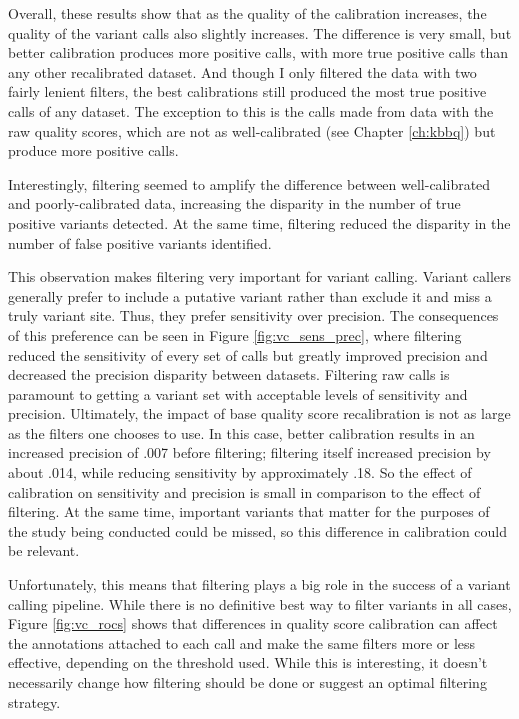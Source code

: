 Overall, these results show that as the quality of the calibration increases, the quality of the variant calls also slightly increases. The difference is very small, but better calibration produces more positive calls, with more true positive calls than any other recalibrated dataset. And though I only filtered the data with two fairly lenient filters, the best calibrations still produced the most true positive calls of any dataset. The exception to this is the calls made from data with the raw quality scores, which are not as well-calibrated (see Chapter \ref{ch:kbbq}) but produce more positive calls.

Interestingly, filtering seemed to amplify the difference between well-calibrated and poorly-calibrated data, increasing the disparity in the number of true positive variants detected. At the same time, filtering reduced the disparity in the number of false positive variants identified.

This observation makes filtering very important for variant calling. Variant callers generally prefer to include a putative variant rather than exclude it and miss a truly variant site. Thus, they prefer sensitivity over precision. The consequences of this preference can be seen in Figure \ref{fig:vc_sens_prec}, where filtering reduced the sensitivity of every set of calls but greatly improved precision and decreased the precision disparity between datasets. Filtering raw calls is paramount to getting a variant set with acceptable levels of sensitivity and precision. Ultimately, the impact of base quality score recalibration is not as large as the filters one chooses to use. In this case, better calibration results in an increased precision of .007 before filtering; filtering itself increased precision by about .014, while reducing sensitivity by approximately .18. So the effect of calibration on sensitivity and precision is small in comparison to the effect of filtering. At the same time, important variants that matter for the purposes of the study being conducted could be missed, so this difference in calibration could be relevant.

Unfortunately, this means that filtering plays a big role in the success of a variant calling pipeline. While there is no definitive best way to filter variants in all cases, Figure \ref{fig:vc_rocs} shows that differences in quality score calibration can affect the annotations attached to each call and make the same filters more or less effective, depending on the threshold used. While this is interesting, it doesn't necessarily change how filtering should be done or suggest an optimal filtering strategy.

